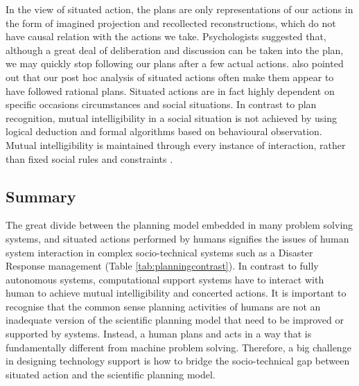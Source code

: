 In the view of situated action, the plans are only representations of our actions in the form of imagined projection and recollected reconstructions, which do not have causal relation with the actions we take. Psychologists \citep{Mead1934} suggested that, although a great deal of deliberation and discussion can be taken into the plan, we may quickly stop following our plans after a few actual actions. \cite{Mead1934} also pointed out that our post hoc analysis of situated actions often make them appear to have followed rational plans. Situated actions are in fact highly dependent on specific occasions circumstances and social situations. In contrast to plan recognition, mutual intelligibility in a social situation is not achieved by using logical deduction and formal algorithms based on behavioural observation.  Mutual intelligibility is maintained through every instance of interaction, rather than fixed social rules and constraints \citep{Suchman1987}.\\


\subsection{Summary}
The great divide between the planning model embedded in many problem solving systems, and situated actions performed by humans signifies the issues of human system interaction in complex socio-technical systems such as a Disaster Response management (Table \ref{tab:planningcontrast}). In contrast to fully autonomous systems, computational support systems have to interact with human to achieve mutual intelligibility and concerted actions. It is important to recognise that the common sense planning activities of humans are not an inadequate version of the scientific planning model that need to be improved or supported by systems. Instead, a human plans and acts in a way that is fundamentally different from machine problem solving. Therefore, a big challenge in designing technology support is how to bridge the socio-technical gap between situated action and the scientific planning model.\\

